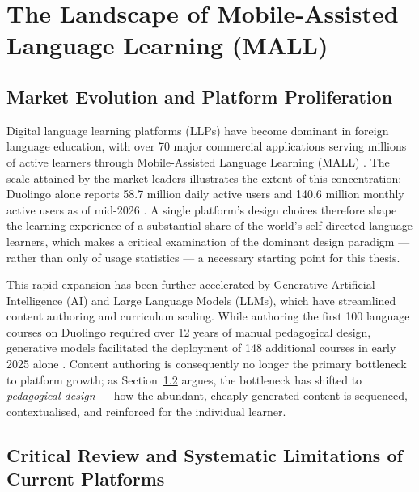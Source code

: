 \section{The Landscape of Mobile-Assisted Language Learning (MALL)}
\label{sec:mall_landscape}

    \subsection{Market Evolution and Platform Proliferation}
    \label{subsec:market_evolution}
    Digital language learning platforms (LLPs) have become dominant in foreign language education, with over 70 major commercial applications serving millions of active learners through Mobile-Assisted Language Learning (MALL) \cite{karasimos2022battle}. The scale attained by the market leaders illustrates the extent of this concentration: Duolingo alone reports 58.7 million daily active users and 140.6 million monthly active users as of mid-2026 \cite{duolingo2026q2}. A single platform's design choices therefore shape the learning experience of a substantial share of the world's self-directed language learners, which makes a critical examination of the dominant design paradigm --- rather than only of usage statistics --- a necessary starting point for this thesis.

    This rapid expansion has been further accelerated by Generative Artificial Intelligence (AI) and Large Language Models (LLMs), which have streamlined content authoring and curriculum scaling. While authoring the first 100 language courses on Duolingo required over 12 years of manual pedagogical design, generative models facilitated the deployment of 148 additional courses in early 2025 alone \cite{duolingo2025launch148}. Content authoring is consequently no longer the primary bottleneck to platform growth; as Section~\ref{subsec:platform_limitations} argues, the bottleneck has shifted to \emph{pedagogical design} --- how the abundant, cheaply-generated content is sequenced, contextualised, and reinforced for the individual learner.

    \subsection{Critical Review and Systematic Limitations of Current Platforms}
    \label{subsec:platform_limitations}

